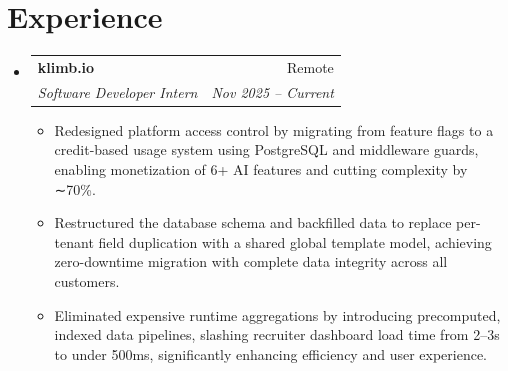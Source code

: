 \documentclass[letterpaper,10pt]{article}
\makeatletter
\newenvironment{resumeList}{
  \begin{itemize}[leftmargin=0.15in, label={}]
}{
  \end{itemize}
}
\newcommand{\resumeItem}[1]{
  \item\small{
    {#1 \vspace{-2.5pt}}
  }
}
\newcommand{\resumeSubheading}[4]{
  \vspace{-2pt}\item
    \begin{tabular*}{0.97\textwidth}[t]{l@{\extracolsep{\fill}}r}
      \textbf{#1} & #2 \\
      \textit{\small#3} & \textit{\small #4} \\
    \end{tabular*}\vspace{-6pt}
}
\newcommand{\resumeItemListStart}{\begin{itemize}[leftmargin=0.15in]}
\newcommand{\resumeItemListEnd}{\end{itemize}\vspace{-5pt}}
\makeatother
\begin{document}
\section{Experience}
\begin{resumeList}
    \resumeSubheading
    {klimb.io}{Remote}
    {Software Developer Intern}{Nov 2025 – Current}
  \resumeItemListStart
    \resumeItem{Redesigned platform access control by migrating from feature flags to a credit-based usage system using PostgreSQL and middleware guards, enabling monetization of 6+ AI features and cutting complexity by ∼70\%.}
    \resumeItem{Restructured the database schema and backfilled data to replace per-tenant field duplication with a shared global template model, achieving zero-downtime migration with complete data integrity across all customers.}
    \resumeItem{Eliminated expensive runtime aggregations by introducing precomputed, indexed data pipelines, slashing recruiter dashboard load time from 2–3s to under 500ms, significantly enhancing efficiency and user experience.}
  \resumeItemListEnd
\end{resumeList}

\end{document}
